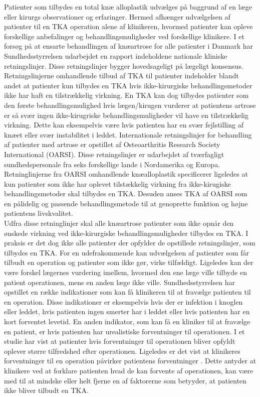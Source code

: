Patienter som tilbydes en total knæ alloplastik udvælges på baggrund af en læge eller kirurgs observationer og erfaringer. Hermed afhænger udvælgelsen af patienter til en TKA operation alene af klinikeren, hvormed patienter kan opleve forskellige anbefalinger og behandlingsmuligheder ved forskellige klinikere. I et forsøg på at ensarte behandlingen af knæartrose for alle patienter i Danmark har Sundhedsstyrrelsen udarbejdet en rapport indeholdene nationale kliniske retningslinjer. Disse retningslinjer bygger hovedsageligt på lægeligt konsensus. Retningslinjerne omhandlende tilbud af TKA til patienter indeholder blandt andet at patienter kun tilbydes en TKA hvis ikke-kirurgiske behandlingsmetoder ikke har haft en tilstrækkelig virkning. En TKA kan dog tilbydes patienter som den første behandlingsmulighed hvis lægen/kirugen vurderer at patientens artrose er så svær ingen ikke-kirugriske behandlingsmuligheder vil have en tilstrækkelig virkning. Dette kan eksempelvis være hvis patienten har en svær fejlstilling af knæet eller svær instabilitet i leddet. \citep{sund2012}    
Internationale retningslinjer for behandling af patienter med artrose er opstillet af Osteoarthritis Research Society International (OARSI). Disse retningslinjer er udarbejdet af tværfagligt sundhedspersonale fra seks forskellige lande i Nordamerika og Europa. Retninglinjerne fra OARSI omhandlende knæalloplastik specificerer ligeledes at kun patienter som ikke har oplevet tilstækkelig virkning fra ikke-kirugiske behandlingsmetoder skal tilbydes en TKA. Desuden anses TKA af OARSI som en pålidelig og passende behandlingsmetode til at genoprette funktion og højne patientens livskvalitet. \citep{zhang2008} \\
Udfra disse retninglinjer skal alle knæartrose patienter som ikke opnår den ønskede virkning ved ikke-kirurgiske behandlingsmuligheder tilbydes en TKA. I praksis er det dog ikke alle patienter der opfylder de opstillede retningslinjer, som tilbydes en TKA. \citep{borkhoff2008} For en udefrakommende kan udvælgelsen af patienter som får tilbudt en operation og patienter som ikke gør, virke tilfældigt. Ligeledes kan der være forskel lægernes vurdering imellem, hvormed den ene læge ville tilbyde en patient operationen, mens en anden læge ikke ville. Sundhedsstyrrelsen har opstillet en række indikationer som kan få klinikeren til at fravælge patienten til en operation. Disse indikationer er eksempelvis hvis der er infektion i knoglen eller leddet, hvis patienten ingen smerter har i leddet eller hvis patienten har en kort forventet levetid. En anden indikator, som kan få en kliniker til at fravælge en patient, er hvis patienten har urealistiske forventninger til operationen. \citep{sund2012} I et studie har \cite{tejada2010} vist at patienter hvis forventninger til operationen bliver opfyldt oplever større tilfredshed efter operationen. Ligeledes er det vist at klinikeres forventninger til en operation påvirker patientens forventninger \citep{tejada2010}. Dette antyder at klinikere ved at forklare patienten hvad de kan forvente af operationen, kan være med til at mindske eller helt fjerne en af faktorerne som betyyder, at patienten ikke bliver tilbudt en TKA. \\
